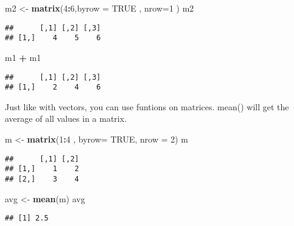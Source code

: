 \documentclass[
]{article}
\newenvironment{Shaded}{\begin{snugshade}}{\end{snugshade}}
\newcommand{\DataTypeTok}[1]{\textcolor[rgb]{0.13,0.29,0.53}{#1}}
\newcommand{\DecValTok}[1]{\textcolor[rgb]{0.00,0.00,0.81}{#1}}
\newcommand{\KeywordTok}[1]{\textcolor[rgb]{0.13,0.29,0.53}{\textbf{#1}}}
\newcommand{\NormalTok}[1]{#1}
\newcommand{\OperatorTok}[1]{\textcolor[rgb]{0.81,0.36,0.00}{\textbf{#1}}}
\newcommand{\OtherTok}[1]{\textcolor[rgb]{0.56,0.35,0.01}{#1}}
\newcommand{\StringTok}[1]{\textcolor[rgb]{0.31,0.60,0.02}{#1}}
\begin{document}
\begin{Shaded}
\begin{Highlighting}[]
\NormalTok{m2 <-}\StringTok{ }\KeywordTok{matrix}\NormalTok{(}\DecValTok{4}\OperatorTok{:}\DecValTok{6}\NormalTok{,}\DataTypeTok{byrow =} \OtherTok{TRUE}\NormalTok{ , }\DataTypeTok{nrow=}\DecValTok{1}\NormalTok{ )}
\NormalTok{m2}
\end{Highlighting}
\end{Shaded}

\begin{verbatim}
##      [,1] [,2] [,3]
## [1,]    4    5    6
\end{verbatim}

\begin{Shaded}
\begin{Highlighting}[]
\NormalTok{m1 }\OperatorTok{+}\StringTok{ }\NormalTok{m1}
\end{Highlighting}
\end{Shaded}

\begin{verbatim}
##      [,1] [,2] [,3]
## [1,]    2    4    6
\end{verbatim}

Just like with vectors, you can use funtions on matrices. mean() will
get the average of all values in a matrix.

\begin{Shaded}
\begin{Highlighting}[]
\NormalTok{m <-}\StringTok{ }\KeywordTok{matrix}\NormalTok{(}\DecValTok{1}\OperatorTok{:}\DecValTok{4}\NormalTok{ , }\DataTypeTok{byrow=} \OtherTok{TRUE}\NormalTok{, }\DataTypeTok{nrow =} \DecValTok{2}\NormalTok{)}
\NormalTok{m}
\end{Highlighting}
\end{Shaded}

\begin{verbatim}
##      [,1] [,2]
## [1,]    1    2
## [2,]    3    4
\end{verbatim}

\begin{Shaded}
\begin{Highlighting}[]
\NormalTok{avg <-}\StringTok{ }\KeywordTok{mean}\NormalTok{(m)}
\NormalTok{avg}
\end{Highlighting}
\end{Shaded}

\begin{verbatim}
## [1] 2.5
\end{verbatim}
\end{document}
